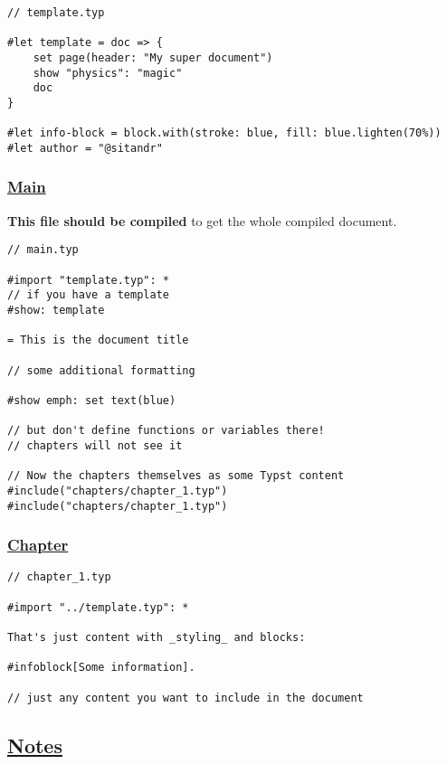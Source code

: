 \begin{verbatim}
// template.typ

#let template = doc => {
    set page(header: "My super document")
    show "physics": "magic"
    doc
}

#let info-block = block.with(stroke: blue, fill: blue.lighten(70%))
#let author = "@sitandr"
\end{verbatim}

\subsubsection{\texorpdfstring{\hyperref[main]{Main}}{Main}}\label{main}

\textbf{This file should be compiled} to get the whole compiled
document.

\begin{verbatim}
// main.typ

#import "template.typ": *
// if you have a template
#show: template

= This is the document title

// some additional formatting

#show emph: set text(blue)

// but don't define functions or variables there!
// chapters will not see it

// Now the chapters themselves as some Typst content
#include("chapters/chapter_1.typ")
#include("chapters/chapter_1.typ")
\end{verbatim}

\subsubsection{\texorpdfstring{\hyperref[chapter]{Chapter}}{Chapter}}\label{chapter}

\begin{verbatim}
// chapter_1.typ

#import "../template.typ": *

That's just content with _styling_ and blocks:

#infoblock[Some information].

// just any content you want to include in the document
\end{verbatim}

\subsection{\texorpdfstring{\hyperref[notes]{Notes}}{Notes}}\label{notes}

